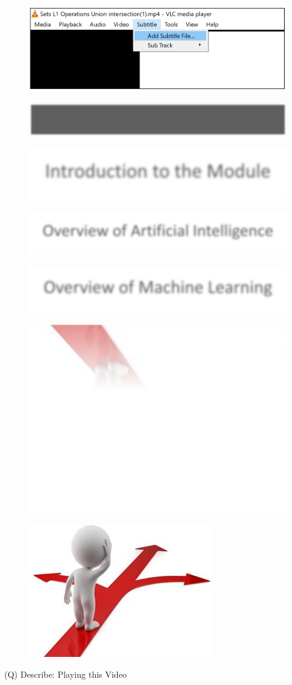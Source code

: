 \documentclass[12pt]{article}
\begin{document}
\begin{figure}[H]
\includegraphics[width=0.5\linewidth]{page1-image-4.png}
\end{figure}
\begin{figure}[H]
\includegraphics[width=0.5\linewidth]{page1-image-5.png}
\end{figure}
\begin{figure}[H]
\includegraphics[width=0.5\linewidth]{page1-image-6.png}
\end{figure}
\begin{figure}[H]
\includegraphics[width=0.5\linewidth]{page1-image-7.png}
\end{figure}
\begin{figure}[H]
\includegraphics[width=0.5\linewidth]{page1-image-8.png}
\end{figure}
\begin{figure}[H]
\includegraphics[width=0.5\linewidth]{page1-image-9.png}
\end{figure}
\begin{figure}[H]
\includegraphics[width=0.5\linewidth]{page1-image-10.png}
\end{figure}
\clearpage
(Q)
Describe: Playing this Video
\clearpage
\end{document}
